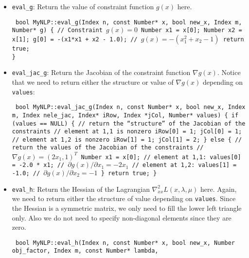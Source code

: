 \documentclass[letter,12pt]{article}
\begin{document}
\begin{itemize}
\item{{\tt eval\_g}}: 
Return the value of constraint function $g(x)$ here.\\
\begin{small}
{\tt
bool MyNLP::eval\_g(Index n, const Number* x, bool new\_x, Index m, Number* g)
\{
{\subitem}  // Constraint $g(x)=0$
{\subitem}  Number x1 = x[0];
{\subitem}  Number x2 = x[1];
{\subitem}  g[0] = -(x1*x1 + x2 - 1.0); // $g(x)=-(x_1^2+x_2-1)$
{\subitem}  return true;\\
\}
}
\end{small}

\item{{\tt eval\_jac\_g}}: 
Return the Jacobian of the constraint function $\nabla g(x)$. Notice
     that we need to return either the structure or value of $\nabla
     g(x)$ depending on {\tt values}:\\
\begin{small}
{\tt
bool MyNLP::eval\_jac\_g(Index n, const Number* x, bool new\_x,
		       Index m, Index nele\_jac, Index* iRow, Index *jCol,
		       Number* values)
\{
{\subitem}  if (values == NULL)
{\subitem}    \{
{\subsubitem}      // return the ``structure'' of the Jacobian of the constraints
{\subsubitem}      // element at 1,1 is nonzero
{\subsubitem}      iRow[0] = 1; jCol[0] = 1;
{\subsubitem}      // element at 1,2 is nonzero 
{\subsubitem}      iRow[1] = 1; jCol[1] = 2;
{\subitem}    \}
{\subitem}  else
{\subitem}    \{
{\subsubitem}      // return the values of the Jacobian of the constraints
{\subsubitem}      //   $\nabla g(x)=\left(2x_1,1\right)^T$
{\subsubitem}      Number x1 = x[0];
{\subsubitem}      // element at 1,1: 
{\subsubitem}      values[0] = -2.0 * x1; // $\partial g(x)/\partial x_1=-2x_1$
{\subsubitem}      // element at 1,2: 
{\subsubitem}      values[1] = -1.0; // $\partial g(x)/\partial x_2=-1$
{\subitem}    \}
{\subitem}  return true;
\}
}
\end{small}
%
\item{{\tt eval\_h}}: 
Return the Hessian of the Lagrangian $\nabla^2_{xx}L(x,\lambda,\mu)$
here. Again, we need to return either the structure of value depending
     on {\tt values}. Since the Hessian is a symmetric matrix, 
we only need to fill the lower left triangle only. Also we do not need
     to specify non-diagonal elements since they are zero.\\
\begin{small}
{\tt
bool MyNLP::eval\_h(Index n, const Number* x, bool new\_x,
		   Number obj\_factor, Index m, const Number* lambda,
}
\end{small}
\end{itemize}
\end{document}
